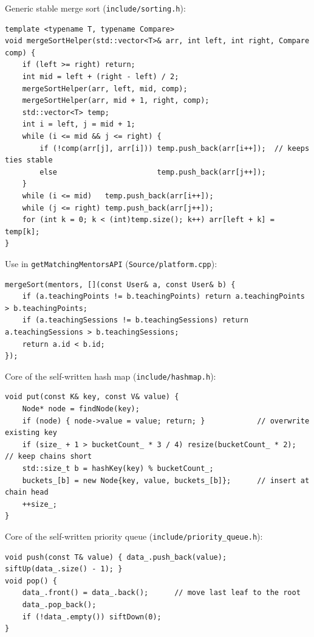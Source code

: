\documentclass[11pt,a4paper]{article}
\begin{document}
Generic stable merge sort (\texttt{include/sorting.h}):

\begin{lstlisting}
template <typename T, typename Compare>
void mergeSortHelper(std::vector<T>& arr, int left, int right, Compare comp) {
    if (left >= right) return;
    int mid = left + (right - left) / 2;
    mergeSortHelper(arr, left, mid, comp);
    mergeSortHelper(arr, mid + 1, right, comp);
    std::vector<T> temp;
    int i = left, j = mid + 1;
    while (i <= mid && j <= right) {
        if (!comp(arr[j], arr[i])) temp.push_back(arr[i++]);  // keeps ties stable
        else                       temp.push_back(arr[j++]);
    }
    while (i <= mid)   temp.push_back(arr[i++]);
    while (j <= right) temp.push_back(arr[j++]);
    for (int k = 0; k < (int)temp.size(); k++) arr[left + k] = temp[k];
}
\end{lstlisting}

Use in \texttt{getMatchingMentorsAPI} (\texttt{Source/platform.cpp}):

\begin{lstlisting}
mergeSort(mentors, [](const User& a, const User& b) {
    if (a.teachingPoints != b.teachingPoints) return a.teachingPoints > b.teachingPoints;
    if (a.teachingSessions != b.teachingSessions) return a.teachingSessions > b.teachingSessions;
    return a.id < b.id;
});
\end{lstlisting}

Core of the self-written hash map (\texttt{include/hashmap.h}):

\begin{lstlisting}
void put(const K& key, const V& value) {
    Node* node = findNode(key);
    if (node) { node->value = value; return; }            // overwrite existing key
    if (size_ + 1 > bucketCount_ * 3 / 4) resize(bucketCount_ * 2);  // keep chains short
    std::size_t b = hashKey(key) % bucketCount_;
    buckets_[b] = new Node{key, value, buckets_[b]};      // insert at chain head
    ++size_;
}
\end{lstlisting}

Core of the self-written priority queue (\texttt{include/priority\_queue.h}):

\begin{lstlisting}
void push(const T& value) { data_.push_back(value); siftUp(data_.size() - 1); }
void pop() {
    data_.front() = data_.back();      // move last leaf to the root
    data_.pop_back();
    if (!data_.empty()) siftDown(0);
}
\end{lstlisting}
\end{document}
